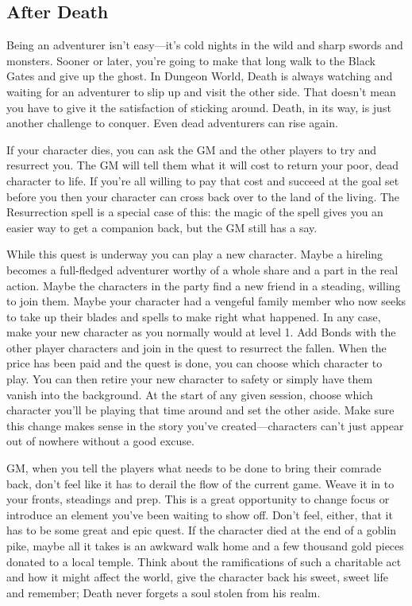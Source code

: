        
\subsection{After Death}   
       

Being an adventurer isn't easy—it's cold nights in the wild and sharp swords and monsters. Sooner or later, you're going to make that long walk to the Black Gates and give up the ghost. In Dungeon World, Death is always watching and waiting for an adventurer to slip up and visit the other side. That doesn't mean you have to give it the satisfaction of sticking around. Death, in its way, is just another challenge to conquer. Even dead adventurers can rise again.

       

If your character dies, you can ask the GM and the other players to try and resurrect you. The GM will tell them what it will cost to return your poor, dead character to life. If you're all willing to pay that cost and succeed at the goal set before you then your character can cross back over to the land of the living. The Resurrection spell is a special case of this: the magic of the spell gives you an easier way to get a companion back, but the GM still has a say.

       

While this quest is underway you can play a new character. Maybe a hireling becomes a full-fledged adventurer worthy of a whole share and a part in the real action. Maybe the characters in the party find a new friend in a steading, willing to join them. Maybe your character had a vengeful family member who now seeks to take up their blades and spells to make right what happened. In any case, make your new character as you normally would at level 1. Add Bonds with the other player characters and join in the quest to resurrect the fallen. When the price has been paid and the quest is done, you can choose which character to play. You can then retire your new character to safety or simply have them vanish into the background. At the start of any given session, choose which character you'll be playing that time around and set the other aside. Make sure this change makes sense in the story you've created—characters can't just appear out of nowhere without a good excuse.

       

GM, when you tell the players what needs to be done to bring their comrade back, don't feel like it has to derail the flow of the current game. Weave it in to your fronts, steadings and prep. This is a great opportunity to change focus or introduce an element you've been waiting to show off. Don't feel, either, that it has to be some great and epic quest. If the character died at the end of a goblin pike, maybe all it takes is an awkward walk home and a few thousand gold pieces donated to a local temple. Think about the ramifications of such a charitable act and how it might affect the world, give the character back his sweet, sweet life and remember; Death never forgets a soul stolen from his realm.

